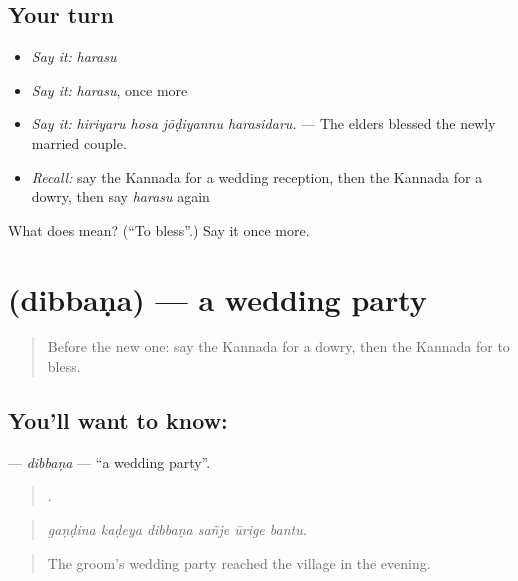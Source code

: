 \subsection*{Your turn}
\begin{itemize}
\raggedright
  \item \emph{Say it:} \emph{harasu}
  \item \emph{Say it:} \emph{harasu}, once more
  \item \emph{Say it:} \emph{hiriyaru hosa jōḍiyannu harasidaru.} — The elders blessed the newly married couple.
  \item \emph{Recall:} say the Kannada for a wedding reception, then the Kannada for a dowry, then say \emph{harasu} again
\end{itemize}

\begin{tcolorbox}[breakable,colback=teal!4,colframe=teal!35!black,title={Before you move on}]
What does  mean? (\textquotedblleft{}To bless\textquotedblright{}.) Say it once more.
\end{tcolorbox}
\section[\texorpdfstring{\kn{ದಿಬ್ಬಣ} (dibbaṇa)}{ದಿಬ್ಬಣ (dibbaṇa)}]{ (dibbaṇa) — a wedding party}

\label{lesson:KA-C325-dibbana}



\begin{quote}
Before the new one: say the Kannada for a dowry, then the Kannada for to bless.
\end{quote}

\subsection*{You'll want to know: }
\textbf{} — \emph{dibbaṇa} — \textquotedblleft{}a wedding party\textquotedblright{}.

\begin{quote}
     .
\end{quote}

\begin{quote}
\emph{gaṇḍina kaḍeya dibbaṇa sañje ūrige bantu.}
\end{quote}

\begin{quote}
The groom's wedding party reached the village in the evening.
\end{quote}

